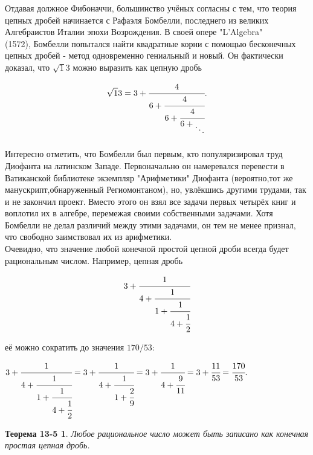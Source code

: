 \documentclass{article}
\begin{document}
 \indent Отдавая должное Фибоначчи, большинство учёных согласны с тем, что теория цепных дробей начинается с Рафаэля Бомбелли, последнего из великих Алгебраистов Италии эпохи Возрождения. В своей опере "L'Algebra" \\(1572),  Бомбелли попытался найти квадратные корни с помощью бесконечных цепных дробей - метод одновременно гениальный и новый. Он фактически доказал, что $\sqrt13$ можно выразить как цепную дробь

 	\[\sqrt13=3+\cfrac{4}{
 		6+\cfrac{4}{
 			6+\cfrac{4}{
 				6+\rotatebox{180}{$\ddots$}}}}.\]

 \noindent Интересно отметить, что Бомбелли был первым, кто популяризировал труд Диофанта на латинском Западе. Первоначально он намеревался перевести в Ватиканской библиотеке экземпляр "Арифметики" Диофанта (вероятно,тот же манускрипт,обнаруженный Региомонтаном), но, увлёкшись другими трудами, так и не закончил проект. Вместо этого он взял все задачи первых четырёх книг и воплотил их в алгебре, перемежая своими собственными задачами. Хотя Бомбелли не делал различий между этими задачами, он тем не менее признал, что свободно заимствовал их из арифметики.\\
 \indent Очевидно, что значение любой конечной простой цепной дроби всегда будет рациональным числом. Например, цепная дробь
 
 	\[3+\cfrac{1}{
 		4+\cfrac{1}{
 			1+\cfrac{1}{
 				4+\cfrac{1}{2}}}}\]
	 
её можно сократить до значения $170/53$:

\begin{center}
	$3+\cfrac{1}{
		4+\cfrac{1}{
			1+\cfrac{1}{
				4+\cfrac{1}{2}}}}=3+\cfrac{1}{
		4+\cfrac{1}{
			1+\cfrac{2}{9}}}
	=3+\cfrac{1}{
		4+\cfrac{9}{11}}
	=3+\cfrac{11}{53}=\cfrac{170}{53}.$						
\end{center}
	
\newpage
\rhead{\textbf{\thepage}}

\newtheorem*{theorem}{Теорема 13-5}
\begin{theorem}
	Любое рациональное число может быть записано как конечная простая цепная дробь.
\end{theorem}
\end{document}
